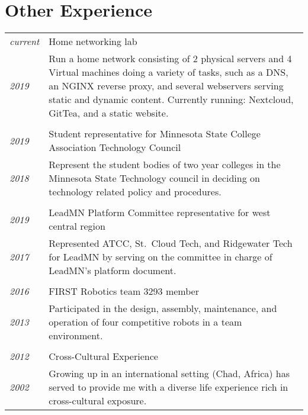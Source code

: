 \documentclass[letterpaper,10pt]{article}
\begin{document}
\section*{Other Experience}
	\begin{tabular}{R{2cm}|p{14cm}}
	\textsl{current} & Home networking lab\\
	\textsl{2019} & Run a home network consisting of 2 physical servers and 4 Virtual machines doing a variety of tasks, such as a DNS, an NGINX reverse proxy, and several webservers serving static and dynamic content. Currently running: Nextcloud, GitTea, and a static website.\\
	\\
	\textsl{2019} & Student representative for Minnesota State College Association Technology Council\\
	\textsl{2018} & Represent the student bodies of two year colleges in the Minnesota State Technology council in deciding on technology related policy and procedures.\\
	\\
	\textsl{2019} & LeadMN Platform Committee representative for west central region\\
	\textsl{2017} & Represented ATCC, St.\ Cloud Tech, and Ridgewater Tech for LeadMN by serving on the committee in charge of LeadMN's platform document.\\
	\\
	\textsl{2016} & FIRST Robotics team 3293 member\\
	\textsl{2013} & Participated in the design, assembly, maintenance, and operation of four competitive robots in a team environment.\\
	\\
	\textsl{2012} & Cross-Cultural Experience\\
	\textsl{2002} &Growing up in an international setting (Chad, Africa) has served to provide me with a diverse life experience rich in cross-cultural exposure.\\
	\end{tabular}
\end{document}
